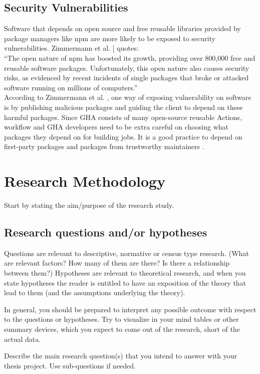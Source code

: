 \documentclass[conference]{IEEEtran}
\begin{document}
\subsection{Security Vulnerabilities}
Software that depends on open source and free reusable libraries provided by package managers like npm are more likely to be exposed to security vulnerabilities. Zimmermann et al. [\cite{b12} quotes: \\
“The open nature of npm has boosted its growth, providing over 800,000 free and reusable software packages. Unfortunately, this open nature also causes security risks, as evidenced by recent incidents of single packages that broke or attacked software running on millions of computers.” \\
 According to Zimmermann et al. \cite{b12}, one way of exposing vulnerability on software is by publishing malicious packages and guiding the client to depend on these harmful packages. Since GHA consists of many open-source reusable Actions, workflow and GHA developers need to be extra careful on choosing what packages they depend on for building jobs. It is a good practice to depend on first-party packages and packages from trustworthy maintainers \cite{b12}.


\section{Research Methodology}
Start by stating the aim/purpose of the research study.

\subsection{Research questions and/or hypotheses}
Questions are relevant to descriptive, normative or census type research. (What are relevant factors? How many of them are there? Is there a relationship between them?) Hypotheses are relevant to theoretical research, and when you state hypotheses the reader is entitled to have an exposition of the theory that lead to them (and the assumptions underlying the theory).

In general, you should be prepared to interpret any possible outcome with respect to the questions or hypotheses. Try to visualize in your mind tables or other summary devices, which you expect to come out of the research, short of the actual data.

Describe the main research question(s) that you intend to answer with your thesis project. Use sub-questions if needed.
\end{document}
